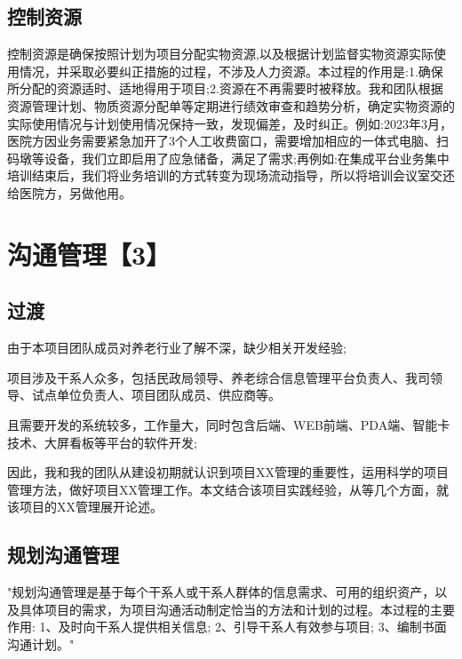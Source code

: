 \documentclass[UTF8]{../computerUniverse}
\begin{document}
\section{控制资源}

控制资源是确保按照计划为项目分配实物资源,以及根据计划监督实物资源实际使用情况，并采取必要纠正措施的过程，不涉及人力资源。本过程的作用是:1.确保所分配的资源适时、适地得用于项目;2.资源在不再需要时被释放。我和团队根据资源管理计划、物质资源分配单等定期进行绩效审查和趋势分析，确定实物资源的实际使用情况与计划使用情况保持一致，发现偏差，及时纠正。例如:2023年3月，医院方因业务需要紧急加开了3个人工收费窗口，需要增加相应的一体式电脑、扫码墩等设备，我们立即启用了应急储备，满足了需求;再例如:在集成平台业务集中培训结束后，我们将业务培训的方式转变为现场流动指导，所以将培训会议室交还给医院方，另做他用。





\chapter{沟通管理【3】}


\section{过渡}

由于本项目团队成员对养老行业了解不深，缺少相关开发经验;

项目涉及干系人众多，包括民政局领导、养老综合信息管理平台负责人、我司领导、试点单位负责人、项目团队成员、供应商等。

且需要开发的系统较多，工作量大，同时包含后端、WEB前端、PDA端、智能卡技术、大屏看板等平台的软件开发;

因此，我和我的团队从建设初期就认识到项目XX管理的重要性，运用科学的项目管理方法，做好项目XX管理工作。本文结合该项目实践经验，从等几个方面，就该项目的XX管理展开论述。


\section{规划沟通管理}

"规划沟通管理是基于每个干系人或干系人群体的信息需求、可用的组织资产，以及具体项目的需求，为项目沟通活动制定恰当的方法和计划的过程。本过程的主要作用:
1、及时向干系人提供相关信息;
2、引导干系人有效参与项目;
3、编制书面沟通计划。"
\end{document}
